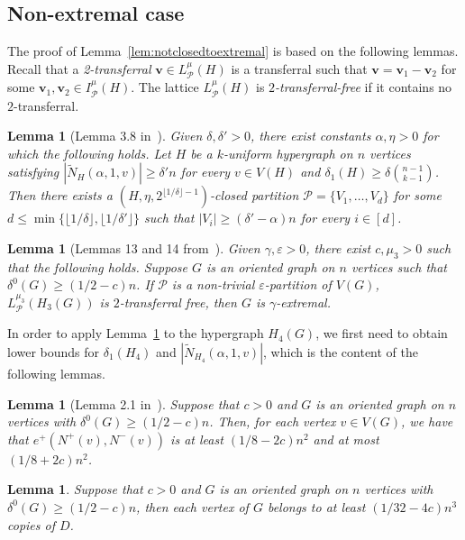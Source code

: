 \documentclass[11pt]{amsart}
\newtheorem{lemma}[theorem]{Lemma}
\newcommand{\CP}{\mathcal{P}}
\newcommand{\wt}{\widetilde}
\newcommand{\veps}{\varepsilon}
\begin{document}
\subsection{Non-extremal case}\label{subsec:non_ext}

The proof of Lemma~\ref{lem:notclosedtoextremal} is based on the following lemmas.
Recall that a \emph{2-transferral} $\mathbf{v}\in L_\CP^\mu(H)$ is a transferral such that $\mathbf{v}=\mathbf{v}_1-\mathbf{v}_2$ for some $\mathbf{v}_1,\mathbf{v}_2\in I_\CP^\mu(H)$.
The lattice $L_\CP^\mu(H)$ is \emph{$2$-transferral-free} if it contains no $2$-transferral.

\begin{lemma}[Lemma 3.8 in~\cite{han}]\label{lem:partition}
    Given $\delta,\delta'>0$, there exist constants $\alpha, \eta>0$ for which the following holds.
    Let $H$ be a $k$-uniform hypergraph on $n$ vertices satisfying $|\wt N_H(\alpha, 1, v)|\ge \delta' n$ for every $v\in V(H)$ and $\delta_1(H)\ge \delta\binom{n-1}{k-1}$.
    Then there exists a $(H,\eta,2^{\lfloor 1/\delta\rfloor-1})$-closed partition $\CP=\{V_1,\dots,V_d\}$ for some $d\le \min\{\lfloor 1/\delta\rfloor,\lfloor 1/\delta'\rfloor\}$ such that $|V_i|\ge (\delta'-\alpha)n$ for every $i\in[d]$.
\end{lemma}

\begin{lemma} [Lemmas 13 and 14 from~\cite{li-molla}]\label{lem:free2extremal}
    Given $\gamma, \veps >0$, there exist $c, \mu_3>0$ such that the following holds. Suppose $G$ is an oriented graph on $n$ vertices such that $\delta^0(G)\ge(1/2-c)n$.
    If $\CP$ is a non-trivial $\veps$-partition of $V(G)$, $L_\CP^{\mu_3}(H_3(G))$ is $2$-transferral free, then $G$ is $\gamma$-extremal.
\end{lemma}

In order to apply Lemma~\ref{lem:partition} to the hypergraph $H_4(G)$, we first need to obtain lower bounds for $\delta_1(H_4)$ and $|\wt N_{H_4}(\alpha, 1, v)|$, which is the content of the following lemmas.

\begin{lemma}[Lemma 2.1 in~\cite{keevash}]\label{lem:keevash}
    Suppose that $c>0$ and $G$ is an oriented graph on $n$ vertices with $\delta^0(G)\ge (1/2-c)n$. Then, for each vertex $v\in V(G)$, we have that $e^+ (N^+(v),N^-(v))$ is at least $(1/8-2c)n^2$ and at most $(1/8+2c)n^2$.
\end{lemma}

\begin{lemma}\label{lem:minimum_degree}
    Suppose that $c>0$ and $G$ is an oriented graph on $n$ vertices with $\delta^0(G)\ge (1/2-c)n$, then each vertex of $G$ belongs to at least $(1/32-4c)n^3$ copies of $D$.
\end{lemma}
\end{document}
